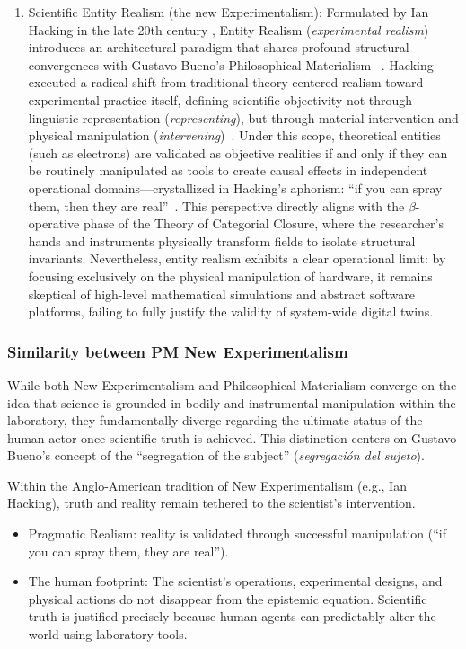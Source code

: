 \documentclass[11pt, a4paper]{article}
\begin{document}
\begin{enumerate}
    \item {Scientific Entity Realism (the new Experimentalism):} Formulated by Ian Hacking in the late 20th century \cite{hacking1983representing}, Entity Realism (\textit{experimental realism}) introduces an architectural paradigm that shares profound structural convergences with Gustavo Bueno's Philosophical Materialism~\cite{madrid2006nuevo} \cite{madrid2006nuevo}. Hacking executed a radical shift from traditional theory-centered realism toward experimental practice itself, defining scientific objectivity not through linguistic representation (\textit{representing}), but through material intervention and physical manipulation (\textit{intervening})~\cite{hacking1982experimentation}. Under this scope, theoretical entities (such as electrons) are validated as objective realities if and only if they can be routinely manipulated as tools to create causal effects in independent operational domains—crystallized in Hacking's aphorism: ``if you can spray them, then they are real''~\cite{hacking1984experimentation}. This perspective directly aligns with the $\beta$-operative phase of the Theory of Categorial Closure, where the researcher's hands and instruments physically transform fields to isolate structural invariants. Nevertheless, entity realism exhibits a clear operational limit: by focusing exclusively on the physical manipulation of hardware, it remains skeptical of high-level mathematical simulations and abstract software platforms, failing to fully justify the validity of system-wide digital twins.
\end{enumerate}



\subsubsection*{Similarity between PM New Experimentalism}

While both New Experimentalism and Philosophical Materialism converge on the idea that science is grounded in bodily and instrumental manipulation within the laboratory, they fundamentally diverge regarding the ultimate status of the human actor once scientific truth is achieved. This distinction centers on Gustavo Bueno's concept of the {``segregation of the subject''} (\textit{segregación del sujeto}).

Within the Anglo-American tradition of New Experimentalism (e.g., Ian Hacking), truth and reality remain tethered to the scientist's intervention.
\begin{itemize}
    \item {Pragmatic Realism:} reality is validated through successful manipulation (``if you can spray them, they are real'').
    \item {The human footprint:} The scientist's operations, experimental designs, and physical actions do not disappear from the epistemic equation. Scientific truth is justified precisely because human agents can predictably alter the world using laboratory tools.
\end{itemize}
\end{document}

